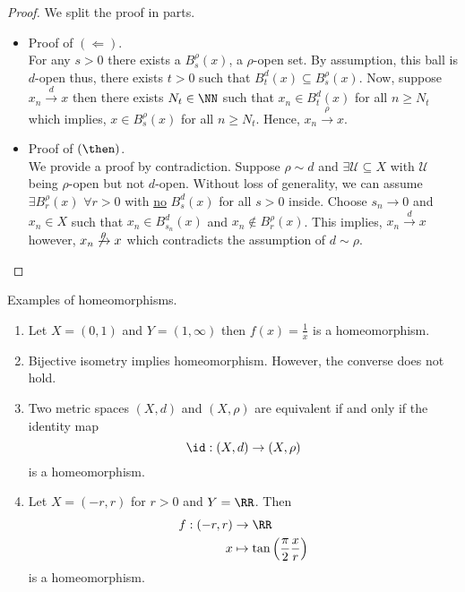 \documentclass[12pt, a4paper]{article}
\begin{document}
\begin{proof}
    We split the proof in parts.
    \begin{itemize}
        \item Proof of \((\Leftarrow)\). \\
        For any \(s>0\) there exists a \(B_s^{\rho}(x)\), a \(\rho\)-open set. By assumption, this ball is \(d\)-open thus, there exists \(t>0\) such that \(B_t^d(x) \subseteq B_s^{\rho}(x)\). Now, suppose \(x_n \xrightarrow{d} x\) then there exists \(N_t \in \NN\) such that \(x_n \in B_t^d(x)\) for all \(n \geq N_t\) which implies, \(x \in B_s^{\rho}(x)\) for all \(n \geq N_t\). Hence, \(x_n \xrightarrow{\rho} x\).
        \item Proof of \((\then)\). \\
        We provide a proof by contradiction. Suppose \(\rho \sim d\) and \(\exists \mathcal{U} \subseteq X\) with \(\mathcal{U}\) being \(\rho\)-open but not \(d\)-open. Without loss of generality, we can assume \(\exists B_r^{\rho}(x)\) \(\forall r>0\) with \underline{no} \(B_s^d(x)\) for all \(s>0\) inside. Choose \(s_n \to 0\) and \(x_n \in X\) such that \(x_n \in B_{s_n}^d(x)\) and \(x_n \not\in B_r^{\rho}(x)\). This implies, \(x_n \xrightarrow{d} x\) however, \(x_n \not\xrightarrow{\rho} x\) which contradicts the assumption of \(d \sim \rho\).
    \end{itemize}
\end{proof}

\begin{mdexample}
    Examples of homeomorphisms.
    \begin{enumerate}
        \item Let \(X=(0,1)\) and \(Y=(1,\infty)\) then \(f(x) = \frac{1}{x}\) is a homeomorphism.
        \item Bijective isometry implies homeomorphism. However, the converse does not hold.
        \item Two metric spaces \((X,d)\) and \((X,\rho)\) are equivalent if and only if the identity map
        \[\id : (X,d) \to (X,\rho)\]
        is a homeomorphism.
        \item Let \(X = (-r,r)\) for \(r>0\) and \(Y=\RR\). Then 
        \[\begin{aligned}
            f:(-r,r) &\to \RR \\
            x &\mapsto \tan\left( \frac{\pi}{2} \frac{x}{r} \right)
        \end{aligned}\]
        is a homeomorphism.
    \end{enumerate}
\end{mdexample}
\end{document}
